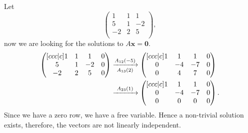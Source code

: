 \begin{example}
    Let
    \[
        \begin{pmatrix}
            1 & 1 & 1 \\
            5 & 1 & -2 \\
            -2 & 2 & 5 \\
        \end{pmatrix}
        ,
    \]
    now we are looking for the solutions to $A \bm{x} = \bm{0}$.
    \begin{align*}
        \begin{pmatrix}[ccc|c]
            1 & 1 & 1 & 0 \\
            5 & 1 & -2 & 0 \\
            -2 & 2 & 5 & 0 \\
        \end{pmatrix}
        & \eroarrow{A_{12}(-5)}{A_{13}(2)}
        \begin{pmatrix}[ccc|c]
            1 & 1 & 1 & 0 \\
            0 & -4 & -7 & 0 \\
            0 & 4 & 7 & 0 \\
        \end{pmatrix} 
        \\
        & \eroarrow{A_{23}(1)}{}
        \begin{pmatrix}[ccc|c]
            1 & 1 & 1 & 0 \\
            0 & -4 & -7 & 0 \\
            0 & 0 & 0 & 0 \\
        \end{pmatrix}
        .
    \end{align*}
    Since we have a zero row, we have a free variable. Hence a non-trivial solution exists, therefore, the vectors are not linearly independent.
\end{example}

